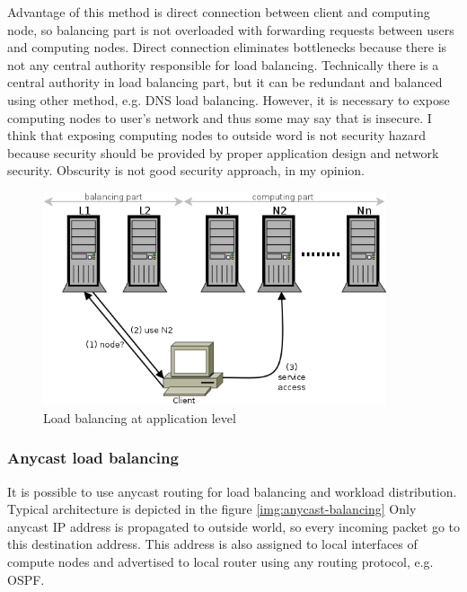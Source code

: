 Advantage of this method is direct connection between client and computing node, so balancing part is not overloaded with forwarding requests between users and computing nodes. Direct connection eliminates bottlenecks because there is not any central authority responsible for load balancing. Technically there is a central authority in load balancing part, but it can be redundant and balanced using other method, e.g. \Ac{DNS} load balancing.  However, it is necessary to expose computing nodes to user's network and thus some may say that is insecure. I think that exposing computing nodes to outside word is not security hazard because security should be provided by proper application design and network security. Obscurity is not good security approach, in my opinion.

\begin{figure}[htb]
	\begin{center}
	\includegraphics[width=0.9\textwidth]{balancing-application.png}
	\end{center}
	\caption{Load balancing at application level}
	\label{img:balancing-application}
\end{figure}

\subsubsection{Anycast load balancing}
It is possible to use anycast routing for load balancing and workload distribution. Typical architecture is depicted in the figure \ref{img:anycast-balancing} Only anycast \Ac{IP} address is propagated to outside world, so every incoming packet go to this destination address. This address is also assigned to local interfaces of compute nodes and advertised to local router using any routing protocol, e.g. \Ac{OSPF}. 

